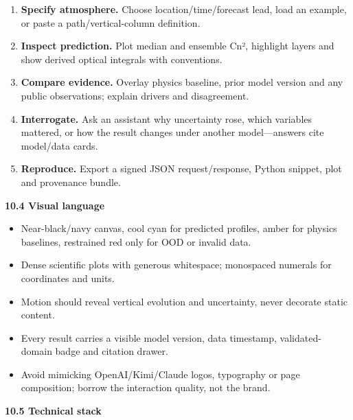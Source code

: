 \documentclass[
]{article}
\begin{document}
\begin{enumerate}
\def\labelenumi{\arabic{enumi}.}
\item
  \textbf{Specify atmosphere.} Choose location/time/forecast lead, load
  an example, or paste a path/vertical-column definition.
\item
  \textbf{Inspect prediction.} Plot median and ensemble Cn², highlight
  layers and show derived optical integrals with conventions.
\item
  \textbf{Compare evidence.} Overlay physics baseline, prior model
  version and any public observations; explain drivers and disagreement.
\item
  \textbf{Interrogate.} Ask an assistant why uncertainty rose, which
  variables mattered, or how the result changes under another
  model---answers cite model/data cards.
\item
  \textbf{Reproduce.} Export a signed JSON request/response, Python
  snippet, plot and provenance bundle.
\end{enumerate}

\textbf{10.4 Visual language}

\begin{itemize}
\item
  Near-black/navy canvas, cool cyan for predicted profiles, amber for
  physics baselines, restrained red only for OOD or invalid data.
\item
  Dense scientific plots with generous whitespace; monospaced numerals
  for coordinates and units.
\item
  Motion should reveal vertical evolution and uncertainty, never
  decorate static content.
\item
  Every result carries a visible model version, data timestamp,
  validated-domain badge and citation drawer.
\item
  Avoid mimicking OpenAI/Kimi/Claude logos, typography or page
  composition; borrow the interaction quality, not the brand.
\end{itemize}

\textbf{10.5 Technical stack}
\end{document}
